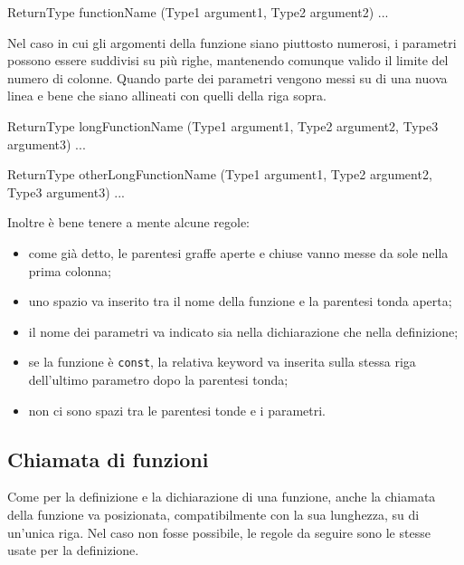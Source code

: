 \noindent\begin{minipage}[t]{\rbwidth}
\begin{RightCode}
ReturnType
functionName (Type1 argument1, Type2 argument2)
{
  ...
}
\end{RightCode}
\end{minipage}%

Nel caso in cui gli argomenti della funzione siano piuttosto numerosi, i parametri possono essere suddivisi su più righe, mantenendo comunque valido il limite del numero di colonne.
Quando parte dei parametri vengono messi su di una nuova linea e bene che siano allineati con quelli della riga sopra.

\noindent\begin{minipage}[t]{\rbwidth}
\begin{RightCode}
ReturnType
longFunctionName (Type1 argument1, Type2 argument2,
                  Type3 argument3)
{
  ...
}

ReturnType
otherLongFunctionName (Type1 argument1,
                       Type2 argument2,
                       Type3 argument3)
{
  ...
}
\end{RightCode}
\end{minipage}%

Inoltre è bene tenere a mente alcune regole:
\begin{itemize}
	\item come già detto, le parentesi graffe aperte e chiuse vanno messe da sole nella prima colonna;
	\item uno spazio va inserito tra il nome della funzione e la parentesi tonda aperta;
	\item il nome dei parametri va indicato sia nella dichiarazione che nella definizione;
	\item se la funzione è \texttt{const}, la relativa keyword va inserita sulla stessa riga dell'ultimo parametro dopo la parentesi tonda;
	\item non ci sono spazi tra le parentesi tonde e i parametri.
\end{itemize}

\subsection{Chiamata di funzioni}

Come per la definizione e la dichiarazione di una funzione, anche la chiamata della funzione va posizionata, compatibilmente con la sua lunghezza, su di un'unica riga.
Nel caso non fosse possibile, le regole da seguire sono le stesse usate per la definizione.

